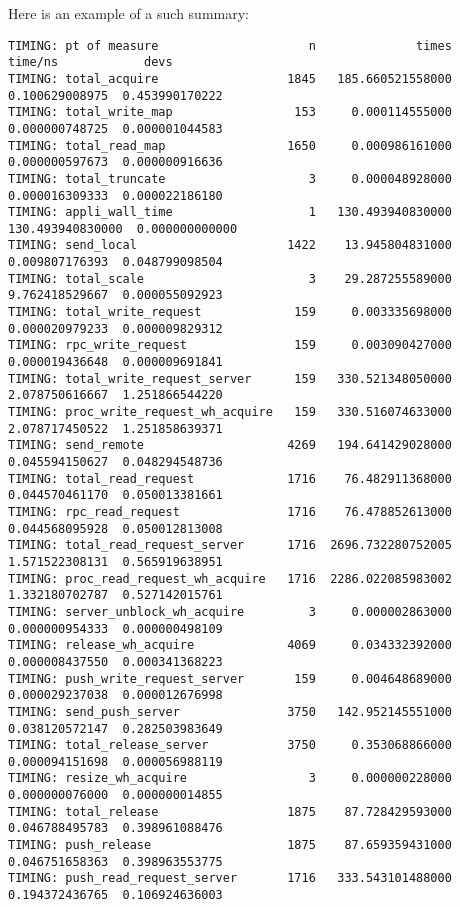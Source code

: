\documentclass[10pt]{article}
\begin{document}
Here is an example of a such summary:
\begin{scriptsize}
\begin{verbatim}
TIMING: pt of measure                     n              times           time/ns            devs
TIMING: total_acquire                  1845   185.660521558000    0.100629008975  0.453990170222
TIMING: total_write_map                 153     0.000114555000    0.000000748725  0.000001044583
TIMING: total_read_map                 1650     0.000986161000    0.000000597673  0.000000916636
TIMING: total_truncate                    3     0.000048928000    0.000016309333  0.000022186180
TIMING: appli_wall_time                   1   130.493940830000  130.493940830000  0.000000000000
TIMING: send_local                     1422    13.945804831000    0.009807176393  0.048799098504
TIMING: total_scale                       3    29.287255589000    9.762418529667  0.000055092923
TIMING: total_write_request             159     0.003335698000    0.000020979233  0.000009829312
TIMING: rpc_write_request               159     0.003090427000    0.000019436648  0.000009691841
TIMING: total_write_request_server      159   330.521348050000    2.078750616667  1.251866544220
TIMING: proc_write_request_wh_acquire   159   330.516074633000    2.078717450522  1.251858639371
TIMING: send_remote                    4269   194.641429028000    0.045594150627  0.048294548736
TIMING: total_read_request             1716    76.482911368000    0.044570461170  0.050013381661
TIMING: rpc_read_request               1716    76.478852613000    0.044568095928  0.050012813008
TIMING: total_read_request_server      1716  2696.732280752005    1.571522308131  0.565919638951
TIMING: proc_read_request_wh_acquire   1716  2286.022085983002    1.332180702787  0.527142015761
TIMING: server_unblock_wh_acquire         3     0.000002863000    0.000000954333  0.000000498109
TIMING: release_wh_acquire             4069     0.034332392000    0.000008437550  0.000341368223
TIMING: push_write_request_server       159     0.004648689000    0.000029237038  0.000012676998
TIMING: send_push_server               3750   142.952145551000    0.038120572147  0.282503983649
TIMING: total_release_server           3750     0.353068866000    0.000094151698  0.000056988119
TIMING: resize_wh_acquire                 3     0.000000228000    0.000000076000  0.000000014855
TIMING: total_release                  1875    87.728429593000    0.046788495783  0.398961088476
TIMING: push_release                   1875    87.659359431000    0.046751658363  0.398963553775
TIMING: push_read_request_server       1716   333.543101488000    0.194372436765  0.106924636003

\end{verbatim}
\end{scriptsize}
\end{document}

